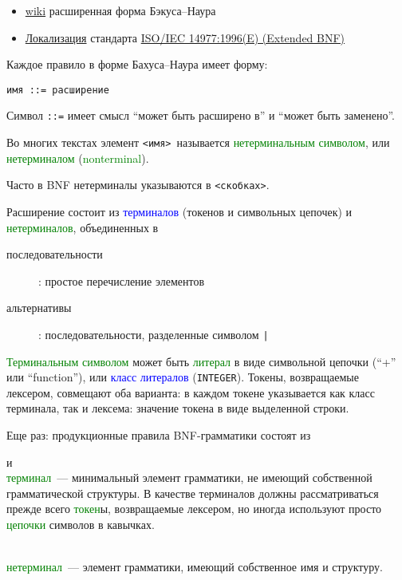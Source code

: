 \documentclass[oneside,10pt]{article}
\renewcommand{\emph}[1]{\textcolor{blue}{#1}}
\newcommand{\term}[1]{\textcolor{green}{#1}}
\begin{document}
\begin{itemize}
  \item
  \href{https://ru.wikipedia.org/wiki/%D0%A0%D0%B0%D1%81%D1%88%D0%B8%D1%80%D0%B5%D0%BD%D0%BD%D0%B0%D1%8F_%D1%84%D0%BE%D1%80%D0%BC%D0%B0_%D0%91%D1%8D%D0%BA%D1%83%D1%81%D0%B0_%E2%80%94_%D0%9D%D0%B0%D1%83%D1%80%D0%B0}{wiki}
  расширенная форма Бэкуса--Наура
  \item
  \href{https://groups.google.com/forum/?hl=ru#!forum/localizations}{Локализация}
  стандарта
  \href{http://standards.iso.org/ittf/PubliclyAvailableStandards/s026153_ISO_IEC_14977_1996(E).zip}{ISO/IEC
  14977:1996(E) (Extended BNF)}
\end{itemize}

\clearpage
Каждое правило в форме Бахуса--Наура имеет форму:
\begin{verbatim}
имя ::= расширение
\end{verbatim}
Символ \verb|::=| имеет смысл ``может быть расширено в'' и ``может быть
заменено''.

Во многих текстах элемент \verb|<имя>|\ называется \term{нетерминальным
символом}, или \term{нетерминалом} (\term{nonterminal}).

Часто в BNF нетерминалы указываются в \verb|<скобках>|. 

\bigskip
Расширение состоит из \emph{терминалов} (токенов и символьных цепочек) и
\term{нетерминалов}, объединенных в 
\begin{description}
  \item[последовательности]: простое перечисление элементов 
  \item[альтернативы]: последовательности, разделенные символом \verb$|$
\end{description}

\clearpage
\term{Терминальным символом} может быть \term{литерал} в виде символьной цепочки
(``+'' или ``function''), или \emph{класс литералов} (\verb|INTEGER|). Токены,
возвращаемые лексером, совмещают оба варианта: в каждом токене указывается как
класс терминала, так и лексема: значение токена в виде выделенной строки.

\bigskip
Еще раз: продукционные правила BNF-грамматики состоят из
\begin{description}[nosep]
  \item[ \term{терминал}ов = терминальных символов] и\ \\
  \term{терминал}\ --- минимальный элемент грамматики, не имеющий собственной
  грамматической структуры. В качестве терминалов должны рассматриваться
  прежде всего \term{токен}ы, возвращаемые лексером, но иногда используют
  просто \term{цепочки} символов в кавычках.
  \item[ \term{нетерминал}ов = продукционных правил]\ \\
  \term{нетерминал}\ --- элемент грамматики, имеющий собственное имя и
  структуру.
\end{description}
\end{document}
